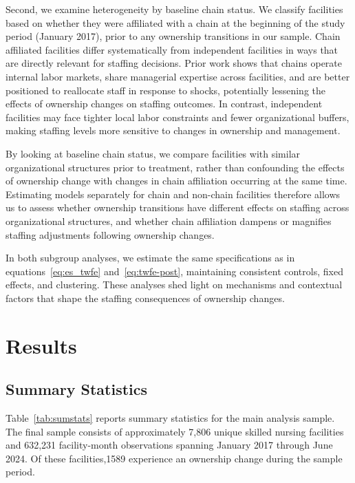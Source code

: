 \documentclass[12pt]{article}
\begin{document}
Second, we examine heterogeneity by baseline chain status. We classify facilities based on whether they were affiliated with a chain at the beginning of the study period (January 2017), prior to any ownership transitions in our sample. Chain affiliated facilities differ systematically from independent facilities in ways that are directly relevant for staffing decisions. Prior work shows that chains operate internal labor markets, share managerial expertise across facilities, and are better positioned to reallocate staff in response to shocks, potentially lessening the effects of ownership changes on staffing outcomes. In contrast, independent facilities may face tighter local labor constraints and fewer organizational buffers, making staffing levels more sensitive to changes in ownership and management.

By looking at baseline chain status, we compare facilities with similar organizational structures prior to treatment, rather than confounding the effects of ownership change with changes in chain affiliation occurring at the same time. Estimating models separately for chain and non-chain facilities therefore allows us to assess whether ownership transitions have different effects on staffing across organizational structures, and whether chain affiliation dampens or magnifies staffing adjustments following ownership changes.

In both subgroup analyses, we estimate the same specifications as in equations~\eqref{eq:es_twfe} and~\eqref{eq:twfe-post}, maintaining consistent controls, fixed effects, and clustering. These analyses shed light on mechanisms and contextual factors that shape the staffing consequences of ownership changes.

\section{Results}

\subsection{Summary Statistics}

Table~\ref{tab:sumstats} reports summary statistics for the main analysis sample. The final sample consists of approximately 7,806 unique skilled nursing facilities and 632,231 facility-month observations spanning January 2017 through June 2024. Of these facilities,1589 experience an ownership change during the sample period.


\FloatBarrier
\end{document}
